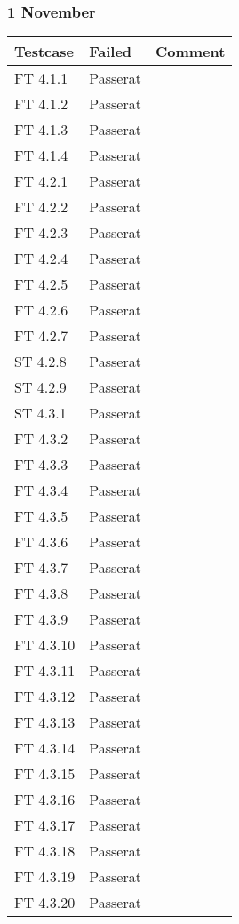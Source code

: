 \documentclass[a4paper]{article}
\begin{document}
\subsubsection{1 November}
\begin{tabular}{| l | l | p{11cm} |}
\hline
Testcase &  Failed & Comment\\
\hline
FT 4.1.1 & Passerat & \\
\hline
FT 4.1.2 & Passerat & \\
\hline
FT 4.1.3 & Passerat & \\
\hline
FT 4.1.4 & Passerat & \\
\hline
FT 4.2.1 & Passerat & \\
\hline
FT 4.2.2 & Passerat & \\
\hline
FT 4.2.3 & Passerat & \\
\hline
FT 4.2.4 & Passerat & \\
\hline
FT 4.2.5 & Passerat & \\
\hline
FT 4.2.6 & Passerat & \\
\hline
FT 4.2.7 & Passerat & \\
\hline
ST 4.2.8 & Passerat & \\
\hline
ST 4.2.9 & Passerat & \\
\hline
ST 4.3.1 & Passerat & \\
\hline
FT 4.3.2 & Passerat & \\
\hline
FT 4.3.3 & Passerat &  \\
\hline
FT 4.3.4 & Passerat & \\
\hline
FT 4.3.5 & Passerat & \\
\hline
FT 4.3.6 & Passerat & \\
\hline
FT 4.3.7 & Passerat & \\
\hline
FT 4.3.8 & Passerat & \\
\hline
FT 4.3.9 & Passerat & \\
\hline
FT 4.3.10 & Passerat & \\
\hline
FT 4.3.11 & Passerat & \\
\hline
FT 4.3.12 & Passerat & \\
\hline
FT 4.3.13 & Passerat & \\
\hline
FT 4.3.14 & Passerat & \\
\hline
FT 4.3.15 & Passerat & \\
\hline
FT 4.3.16 & Passerat & \\
\hline
FT 4.3.17 & Passerat & \\
\hline
FT 4.3.18 & Passerat & \\
\hline
FT 4.3.19 & Passerat & \\
\hline
FT 4.3.20 & Passerat & \\
\hline
\end{tabular}
\end{document}
